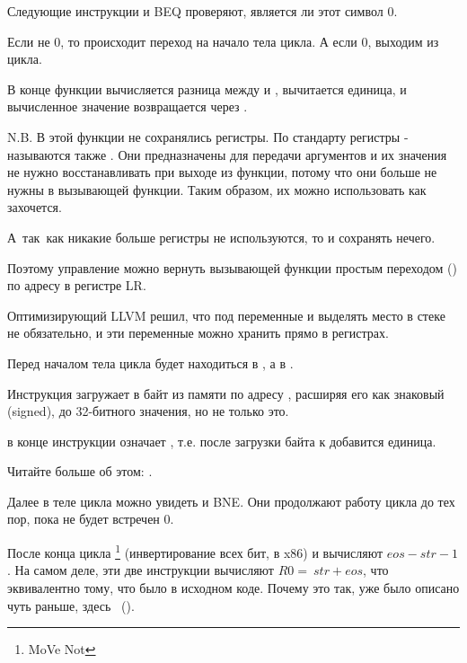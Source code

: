 Следующие инструкции \CMP и \ac{BEQ} проверяют, является ли этот символ 0.

Если не 0, то происходит переход на начало тела цикла.
А если 0, выходим из цикла.

В конце функции вычисляется разница между 
 и , вычитается единица, и вычисленное 
значение возвращается через .

N.B. В этой функции не сохранялись регистры.
По стандарту регистры - называются также .
Они предназначены для передачи аргументов и 
их значения не нужно восстанавливать при выходе из функции, потому что они больше не нужны в вызывающей функции.
Таким образом, их можно использовать как захочется.

А~так~как никакие больше регистры не используются, то и сохранять нечего.

Поэтому управление можно вернуть вызывающей функции 
простым переходом () по адресу в регистре \ac{LR}.

\myparagraphold{\OptimizingXcodeIV (\ThumbMode)}



Оптимизирующий LLVM решил, что под переменные  и  выделять место в стеке не обязательно,
и эти переменные можно хранить прямо в регистрах.

Перед началом тела цикла  будет находиться в , 
а \EMDASH{}в .

Инструкция  загружает в  байт из памяти по адресу , 
расширяя его как знаковый (signed), до 32-битного
значения, но не только это.

 в конце инструкции означает ,
т.е. после загрузки байта к  добавится единица.

Читайте больше об этом: .

Далее в теле цикла можно увидеть \CMP и \ac{BNE}. Они продолжают работу цикла до тех пор, 
пока не будет встречен 0.

После конца цикла \footnote{MoVe Not} (инвертирование всех бит, \NOT в x86) и \ADD вычисляют $eos - str - 1$.
На самом деле, эти две инструкции вычисляют $R0 = ~str + eos$, 
что эквивалентно тому, что было в исходном коде. Почему это так, уже было описано чуть раньше, здесь 
~().

